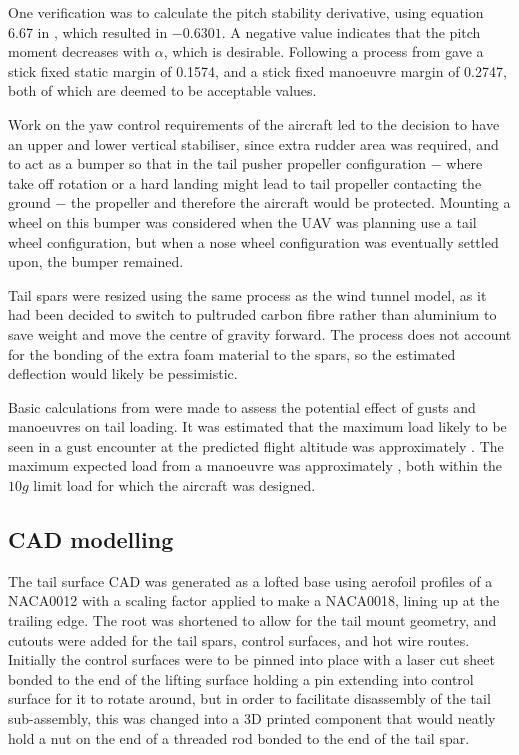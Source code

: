 \documentclass[../../main.tex]{subfiles}
\begin{document}
One verification was to calculate the pitch stability derivative, using equation 6.67 in \cite{sadraey-13}, which resulted in $-0.6301$.
A negative value indicates that the pitch moment decreases with $\alpha$, which is desirable.
Following a process from \cite{de-kat-17} gave a stick fixed static margin of 0.1574, and a stick fixed manoeuvre margin of 0.2747, both of which are deemed to be acceptable values. 

Work on the yaw control requirements of the aircraft led to the decision to have an upper and lower vertical stabiliser, since extra rudder area was required, and to act as a bumper so that in the tail pusher propeller configuration $-$ where take off rotation or a hard landing might lead to tail propeller contacting the ground $-$ the propeller and therefore the aircraft would be protected.
Mounting a wheel on this bumper was considered when the UAV was planning use a tail wheel configuration, but when a nose wheel configuration was eventually settled upon, the bumper remained. 

Tail spars were resized using the same process as the wind tunnel model, as it had been decided to switch to pultruded carbon fibre rather than aluminium to save weight and move the centre of gravity forward.
The process does not account for the bonding of the extra foam material to the spars, so the estimated deflection would likely be pessimistic.  

Basic calculations from \cite{bresloff-18} were made to assess the potential effect of gusts and manoeuvres on tail loading.
It was estimated that the maximum load likely to be seen in a gust encounter at the predicted flight altitude was approximately .
The maximum expected load from a manoeuvre was approximately , both within the $10g$ limit load for which the aircraft was designed. 

\subsection{CAD modelling} \label{sec:final-design-proposal:tail:cad-modelling}

The tail surface CAD was generated as a lofted base using aerofoil profiles of a NACA0012 with a scaling factor applied to make a NACA0018, lining up at the trailing edge.
The root was shortened to allow for the tail mount geometry, and cutouts were added for the tail spars, control surfaces, and hot wire routes.
Initially the control surfaces were to be pinned into place with a laser cut sheet bonded to the end of the lifting surface holding a pin extending into control surface for it to rotate around, but in order to facilitate disassembly of the tail sub-assembly, this was changed into a 3D printed component that would neatly hold a nut on the end of a threaded rod bonded to the end of the tail spar.
\end{document}
